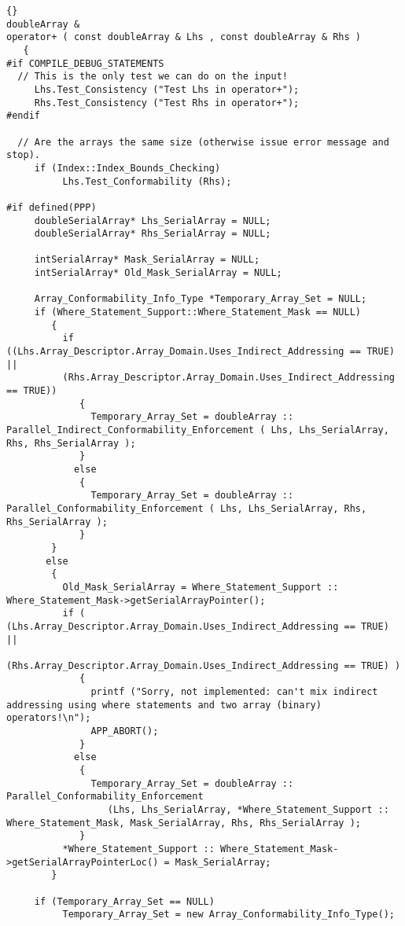 \documentclass[10pt]{llncs}
\begin{document}
\begin{lstlisting}{}
doubleArray &
operator+ ( const doubleArray & Lhs , const doubleArray & Rhs )
   {
#if COMPILE_DEBUG_STATEMENTS
  // This is the only test we can do on the input!
     Lhs.Test_Consistency ("Test Lhs in operator+");
     Rhs.Test_Consistency ("Test Rhs in operator+");
#endif

  // Are the arrays the same size (otherwise issue error message and stop).
     if (Index::Index_Bounds_Checking)
          Lhs.Test_Conformability (Rhs);

#if defined(PPP)
     doubleSerialArray* Lhs_SerialArray = NULL;
     doubleSerialArray* Rhs_SerialArray = NULL;

     intSerialArray* Mask_SerialArray = NULL;
     intSerialArray* Old_Mask_SerialArray = NULL;

     Array_Conformability_Info_Type *Temporary_Array_Set = NULL;
     if (Where_Statement_Support::Where_Statement_Mask == NULL)
        {
          if ((Lhs.Array_Descriptor.Array_Domain.Uses_Indirect_Addressing == TRUE) ||
	      (Rhs.Array_Descriptor.Array_Domain.Uses_Indirect_Addressing == TRUE))
             {
               Temporary_Array_Set = doubleArray :: Parallel_Indirect_Conformability_Enforcement ( Lhs, Lhs_SerialArray, Rhs, Rhs_SerialArray );
             }
            else
             {
               Temporary_Array_Set = doubleArray :: Parallel_Conformability_Enforcement ( Lhs, Lhs_SerialArray, Rhs, Rhs_SerialArray );
             }
        }
       else
        {
          Old_Mask_SerialArray = Where_Statement_Support :: Where_Statement_Mask->getSerialArrayPointer();
          if ( (Lhs.Array_Descriptor.Array_Domain.Uses_Indirect_Addressing == TRUE) ||
               (Rhs.Array_Descriptor.Array_Domain.Uses_Indirect_Addressing == TRUE) )
             {
               printf ("Sorry, not implemented: can't mix indirect addressing using where statements and two array (binary) operators!\n");
               APP_ABORT();
             }
            else
             {
               Temporary_Array_Set = doubleArray :: Parallel_Conformability_Enforcement
                  (Lhs, Lhs_SerialArray, *Where_Statement_Support :: Where_Statement_Mask, Mask_SerialArray, Rhs, Rhs_SerialArray );
             }
          *Where_Statement_Support :: Where_Statement_Mask->getSerialArrayPointerLoc() = Mask_SerialArray;
        }

     if (Temporary_Array_Set == NULL)
          Temporary_Array_Set = new Array_Conformability_Info_Type();


\end{lstlisting}
\end{document}
